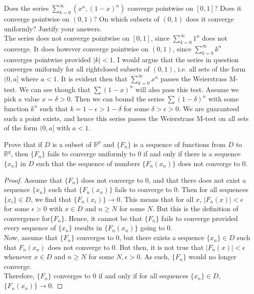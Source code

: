\documentclass[12pt]{book}
\newcommand{\R}{\mathbb{R}}
\newenvironment{exercise}[2][Exercise]{\begin{trivlist}
\item[\hskip \labelsep {\bfseries #1}\hskip \labelsep {\bfseries #2.}]}{\end{trivlist}}
\begin{document}
\begin{exercise}{8.3.10}
Does the series $\sum_{k=0}^\infty \left( x^n, (1-x)^n \right)$ converge pointwise on $[0,1]$? Does it converge pointwise on $(0,1)$? On which subsets of $(0,1)$ does it converge uniformly? Justify your answers. \\

The series does not converge pointwise on $[0,1]$, since $\sum_{k=0}^\infty 1^n$ does not converge. It does however converge pointwise on $(0,1)$, since $\sum_{k=0}^\infty k^n$ converges pointwise provided $|k| < 1$. I would argue that the series in question converges uniformly for all rightclosed subsets of $(0,1)$, i.e. all sets of the form $(0,a]$ where $a<1$. It is evident then that $\sum_{k=0}^\infty x^n$ passes the Weierstrass M-test. We can see though that $\sum (1-x)^n$ will also pass this test. Assume we pick a value $x = \delta>0$. Then we can bound the series $\sum (1- \delta)^n$ with some function $k^n$ such that $k = 1 - \epsilon > 1 - \delta$ for some $\delta > \epsilon > 0$. We are guaranteed such a point exists, and hence this series passes the Weierstrass M-test on all sets of the form $(0,a]$ with $a<1$.
\end{exercise}




\begin{exercise}{8.3.12}
Prove that if $D$ is a subset of $\R^p$ and $\{ F_n\}$ is a sequence of functions from $D$ to $\R^q$, then $\{F_n\}$ fails to converge uniformly to 0 if and only if there is a sequence $\{x_n\}$ in $D$ such that the sequence of numbers $\{ F_n (x_n) \}$ does not converge to 0. 

\begin{proof}
    Assume that $\{F_n\}$ does not converge to 0, and that there does not exist a sequence $\{x_n\}$ such that $\{F_n(x_n)\}$ fails to converge to 0. Then for all sequences $\{x_i\} \in D$, we find that $\{F_n ( x_i)\} \to 0$. This means that for all $x$, $\left| F_n (x) \right| < \epsilon$ for some $\epsilon >0$  with $x \in D$ and $n \geq N$ for some $N$. But this is the definition of convergence for$\{F_n\}$. Hence, it cannot be that $\{F_n\}$ fails to converge provided every sequence of $\{x_n\}$ results in $\{F_n (x_n)\}$ going to 0. \\

    Now, assume that $\{F_n\}$ converges to 0, but there exists a sequence $\{x_n\} \in D$ such that $F_n(x_n)$ does not converge to 0. But then, it is not true that $|F_n(x)|< \epsilon$ whenever $x \in D$ and $n \geq N$ for some $N, \epsilon>0$. As such, $\{F_n\}$ would no longer converge. \\

    Therefore, $\{F_n\}$ converges to 0 if and only if for all sequences $\{x_n\} \in D$, $\{ F_n(x_n)\} \to 0$.
\end{proof}
\end{exercise}
\end{document}
